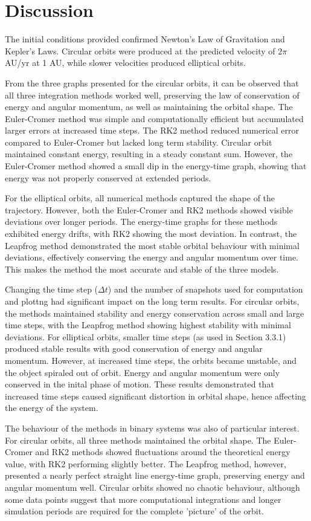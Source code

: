 \documentclass[11 pt, a4paper, twocolumn]{article}
\begin{document}
\section{Discussion}
The initial conditions provided confirmed Newton's Law of Gravitation and Kepler's Laws. Circular 
orbits were produced at the predicted velocity of $2\pi$ AU/yr at 1 AU, while slower velocities produced
elliptical orbits.

From the three graphs presented for the circular orbits, it can be observed that all three integration 
methods worked well, preserving the law of conservation of energy and angular momentum, as well as maintaining
the orbital shape. The Euler-Cromer method was simple and computationally efficient but accumulated
larger errors at increased time steps. The RK2 method reduced numerical error compared to Euler-Cromer
but lacked long term stability. Circular orbit maintained constant energy, resulting in a steady constant
sum. However, the Euler-Cromer method showed a small dip in the energy-time graph, showing that energy
was not properly conserved at extended periods.

For the elliptical orbits, all numerical methods captured the shape of the trajectory. However, both 
the Euler-Cromer and RK2 methods showed visible deviations over longer periods. The energy-time graphs 
for these methods exhibited energy drifts, with RK2 showing the most deviation. In contrast, the Leapfrog
method demonstrated the most stable orbital behaviour with minimal deviations, effectively conserving the
energy and angular momentum over time. This makes the method the most accurate and stable of the three models.

Changing the time step ($\Delta t$) and the number of snapshots used for computation and plottng had
significant impact on the long term results. For circular orbits, the methods maintained stability and 
energy conservation across small and large time steps, with the Leapfrog method showing highest stability
with minimal deviations. For elliptical orbits, smaller time steps (as used in Section 3.3.1) produced
stable results with good conservation of energy and angular momentum. However, at increased time steps, 
the orbits became unstable, and the object spiraled out of orbit. Energy and angular momentum were only 
conserved in the inital phase of motion. These results demonstrated that increased time steps caused significant
distortion in orbital shape, hence affecting the energy of the system.

The behaviour of the methods in binary systems was also of particular interest. For circular orbits, all
three methods maintained the orbital shape. The Euler-Cromer and RK2 methods showed fluctuations around 
the theoretical energy value, with RK2 performing slightly better. The Leapfrog method, however, 
presented a nearly perfect straight line energy-time graph, preserving energy and angular momentum well.
Circular orbits showed no chaotic behaviour, although some data points suggest that more computational integrations
and longer simulation periods are required for the complete 'picture' of the orbit.
\end{document}
